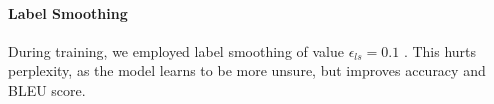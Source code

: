
\paragraph{Label Smoothing} During training, we employed label smoothing of value $\epsilon_{ls}=0.1$ \citep{DBLP:journals/corr/SzegedyVISW15}.  This hurts perplexity, as the model learns to be more unsure, but improves accuracy and BLEU score.
